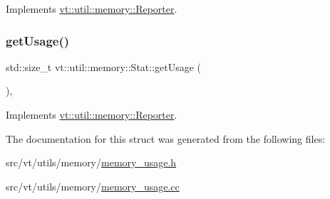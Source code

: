 Implements \hyperlink{structvt_1_1util_1_1memory_1_1_reporter_a83fc36e9cff3ce2deedf1d4546694713}{vt\+::util\+::memory\+::\+Reporter}.

\mbox{\label{structvt_1_1util_1_1memory_1_1_stat_aa14297e6605a523e4164597d45fba06f}} 
\subsubsection{\texorpdfstring{get\+Usage()}{getUsage()}}
{\footnotesize\ttfamily std\+::size\+\_\+t vt\+::util\+::memory\+::\+Stat\+::get\+Usage (\begin{DoxyParamCaption}{ }\end{DoxyParamCaption})\hspace{0.3cm}{\ttfamily [override]}, {\ttfamily [virtual]}}



Implements \hyperlink{structvt_1_1util_1_1memory_1_1_reporter_a372574f51fdb68077cd3d227ee373de5}{vt\+::util\+::memory\+::\+Reporter}.



The documentation for this struct was generated from the following files\+:\begin{DoxyCompactItemize}
\item 
src/vt/utils/memory/\hyperlink{memory__usage_8h}{memory\+\_\+usage.\+h}\item 
src/vt/utils/memory/\hyperlink{memory__usage_8cc}{memory\+\_\+usage.\+cc}\end{DoxyCompactItemize}
